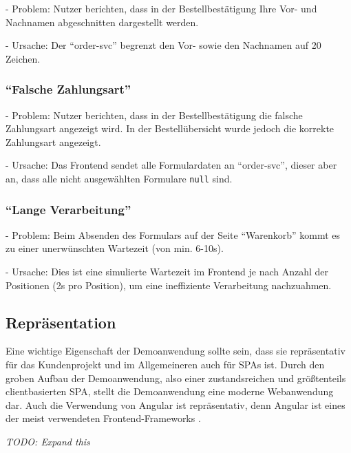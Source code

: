 - Problem: Nutzer berichten, dass in der Bestellbestätigung Ihre Vor- und Nachnamen abgeschnitten dargestellt werden.

- Ursache: Der \enquote{order-svc} begrenzt den Vor- sowie den Nachnamen auf 20 Zeichen.

\subsubsection{\enquote{Falsche Zahlungsart}}

- Problem: Nutzer berichten, dass in der Bestellbestätigung die falsche Zahlungsart angezeigt wird. In der Bestellübersicht wurde jedoch die korrekte Zahlungsart angezeigt.

- Ursache: Das Frontend sendet alle Formulardaten an \enquote{order-svc}, dieser aber an, dass alle nicht ausgewählten Formulare \texttt{null} sind.

\subsubsection{\enquote{Lange Verarbeitung}}

- Problem: Beim Absenden des Formulars auf der Seite \enquote{Warenkorb} kommt es zu einer unerwünschten Wartezeit (von min. 6-10s).

- Ursache: Dies ist eine simulierte Wartezeit im Frontend je nach Anzahl der Positionen (2s pro Position), um eine ineffiziente Verarbeitung nachzuahmen.

\subsection{Repräsentation}

Eine wichtige Eigenschaft der Demoanwendung sollte sein, dass sie repräsentativ für das Kundenprojekt und im Allgemeineren auch für SPAs ist. Durch den groben Aufbau der Demoanwendung, also einer zustandsreichen und größtenteils clientbasierten SPA, stellt die Demoanwendung eine moderne Webanwendung dar. Auch die Verwendung von Angular ist repräsentativ, denn Angular ist eines der meist verwendeten Frontend-Frameworks \cite{TheStateOfJavaScript2020}.

\textit{\color{red}TODO: Expand this}